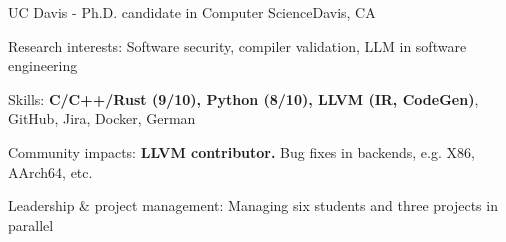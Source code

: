 \renewcommand{\timeInterval}{\DTMdisplaydate{2019}{9}{27}{-1} - }

\ifx\lang\eng
	\begin{rSubsection}{UC Davis}{\timeInterval}{Ph.D. candidate in Computer Science}{Davis, CA}
		\item Research interests: Software security, compiler validation, LLM in software engineering
		\item Skills: \textbf{C/C++/Rust (9/10), Python (8/10), LLVM (IR, CodeGen)}, GitHub, Jira, Docker, German
		\item Community impacts: \textbf{LLVM contributor.} Bug fixes in backends, e.g. X86, AArch64, etc.
		\item Leadership \& project management: Managing six students and three projects in parallel
	\end{rSubsection}
	\vspace{-0.1em}
\else
\fi

\renewcommand{\timeInterval}{}